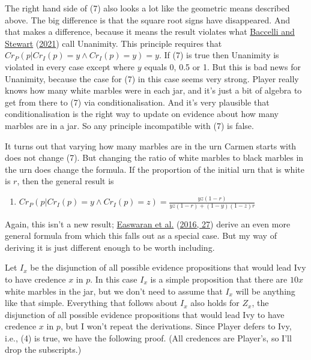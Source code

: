 \documentclass[
  12pt,
]{article}
\providecommand{\tightlist}{%
  \setlength{\itemsep}{0pt}\setlength{\parskip}{0pt}}
\begin{document}
The right hand side of (7) also looks a lot like the geometric means
described above. The big difference is that the square root signs have
disappeared. And that makes a difference, because it means the result
violates what \protect\hyperlink{ref-BaccelliStewart2021}{Baccelli and
Stewart} (\protect\hyperlink{ref-BaccelliStewart2021}{2021}) call
Unanimity. This principle requires that
\(Cr_P(p | Cr_I(p) = y \wedge Cr_I(p) = y) = y\). If (7) is true then
Unanimity is violated in every case except where \(y\) equals 0, 0.5 or
1. But this is bad news for Unanimity, because the case for (7) in this
case seems very strong. Player really knows how many white marbles were
in each jar, and it's just a bit of algebra to get from there to (7) via
conditionalisation. And it's very plausible that conditionalisation is
the right way to update on evidence about how many marbles are in a jar.
So any principle incompatible with (7) is false.

It turns out that varying how many marbles are in the urn Carmen starts
with does not change (7). But changing the ratio of white marbles to
black marbles in the urn does change the formula. If the proportion of
the initial urn that is white is \(r\), then the general result is

\begin{enumerate}
\def\labelenumi{(\arabic{enumi})}
\setcounter{enumi}{7}
\tightlist
\item
  \(Cr_P(p | Cr_I(p) = y \wedge Cr_I(p) = z) = \frac{yz(1-r)}{yz(1-r) + (1-y)(1-z)r}\)
\end{enumerate}

Again, this isn't a new result;
\protect\hyperlink{ref-EaswaranEtAl2016}{Easwaran et al.}
(\protect\hyperlink{ref-EaswaranEtAl2016}{2016, 27}) derive an even more
general formula from which this falls out as a special case. But my way
of deriving it is just different enough to be worth including.

Let \(I_x\) be the disjunction of all possible evidence propositions
that would lead Ivy to have credence \(x\) in \(p\). In this case
\(I_x\) is a simple proposition that there are \(10x\) white marbles in
the jar, but we don't need to assume that \(I_x\) will be anything like
that simple. Everything that follows about \(I_x\) also holds for
\(Z_x\), the disjunction of all possible evidence propositions that
would lead Ivy to have credence \(x\) in \(p\), but I won't repeat the
derivations. Since Player defers to Ivy, i.e., (4) is true, we have the
following proof. (All credences are Player's, so I'll drop the
subscripts.)
\end{document}
